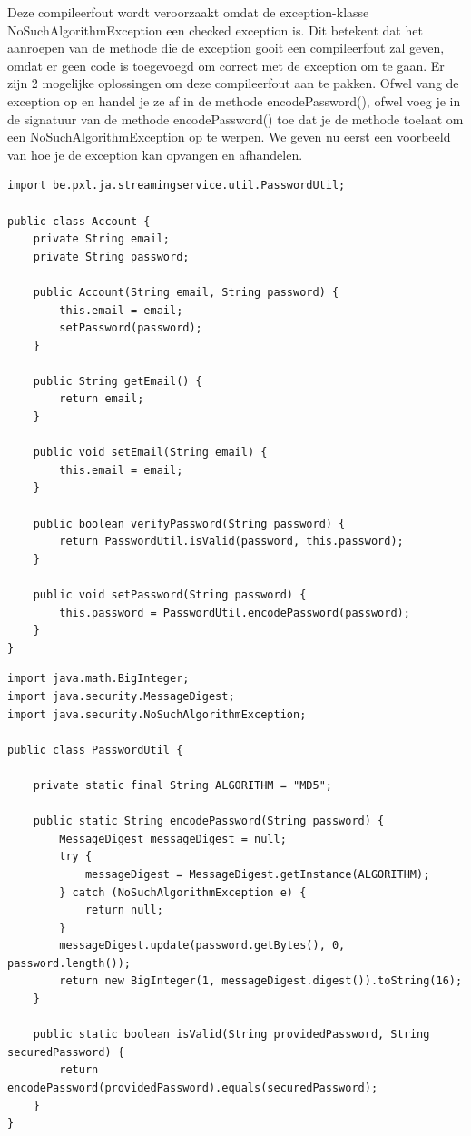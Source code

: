 \documentclass{tstextbook}
\begin{document}
Deze compileerfout wordt veroorzaakt omdat de exception-klasse NoSuchAlgorithmException een checked exception is. Dit betekent dat het aanroepen van de methode die de exception gooit een compileerfout zal geven, omdat er geen code is toegevoegd om correct met de  exception om te gaan.
Er zijn 2 mogelijke oplossingen om deze compileerfout aan te pakken. Ofwel vang de exception op en handel je ze af in de methode encodePassword(), ofwel voeg je in de signatuur van de methode encodePassword() toe dat je de methode toelaat om een NoSuchAlgorithmException op te werpen. We geven nu eerst een voorbeeld van hoe je de exception kan opvangen en afhandelen. 

\begin{lstlisting}
import be.pxl.ja.streamingservice.util.PasswordUtil;

public class Account {
	private String email;
	private String password;

	public Account(String email, String password) {
		this.email = email;
		setPassword(password);
	}

	public String getEmail() {
		return email;
	}

	public void setEmail(String email) {
		this.email = email;
	}

	public boolean verifyPassword(String password) {
		return PasswordUtil.isValid(password, this.password);
	}

	public void setPassword(String password) {
		this.password = PasswordUtil.encodePassword(password);
	}
}
\end{lstlisting}

\begin{lstlisting}
import java.math.BigInteger;
import java.security.MessageDigest;
import java.security.NoSuchAlgorithmException;

public class PasswordUtil {

	private static final String ALGORITHM = "MD5";

	public static String encodePassword(String password) {
		MessageDigest messageDigest = null;
		try {
			messageDigest = MessageDigest.getInstance(ALGORITHM);
		} catch (NoSuchAlgorithmException e) {
			return null;
		}
		messageDigest.update(password.getBytes(), 0, password.length());
		return new BigInteger(1, messageDigest.digest()).toString(16);
	}

	public static boolean isValid(String providedPassword, String securedPassword) {
		return encodePassword(providedPassword).equals(securedPassword);
	}
}
\end{lstlisting}
\end{document}
